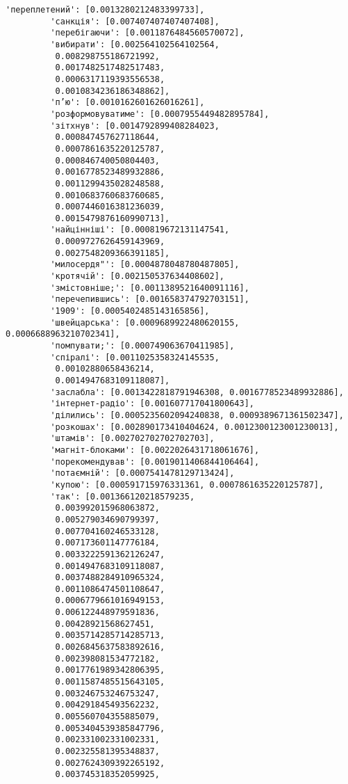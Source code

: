 \documentclass[11pt]{article}
\begin{document}
\begin{Verbatim}[commandchars=\\\{\}]
         'переплетений': [0.0013280212483399733],
         'санкція': [0.007407407407407408],
         'перебігаючи': [0.0011876484560570072],
         'вибирати': [0.002564102564102564,
          0.008298755186721992,
          0.0017482517482517483,
          0.0006317119393556538,
          0.0010834236186348862],
         'п’ю': [0.0010162601626016261],
         'розформовуватиме': [0.0007955449482895784],
         'зітхнув': [0.0014792899408284023,
          0.000847457627118644,
          0.0007861635220125787,
          0.000846740050804403,
          0.0016778523489932886,
          0.0011299435028248588,
          0.0010683760683760685,
          0.0007446016381236039,
          0.0015479876160990713],
         'найцінніші': [0.000819672131147541,
          0.0009727626459143969,
          0.0027548209366391185],
         'милосердя"': [0.0004878048780487805],
         'кротячій': [0.002150537634408602],
         'змістовніше;': [0.0011389521640091116],
         'перечепившись': [0.001658374792703151],
         '1909': [0.0005402485143165856],
         'швейцарська': [0.0009689922480620155, 0.0006688963210702341],
         'помпувати;': [0.000749063670411985],
         'спіралі': [0.0011025358324145535,
          0.00102880658436214,
          0.0014947683109118087],
         'заслабла': [0.0013422818791946308, 0.0016778523489932886],
         'інтернет-радіо': [0.001607717041800643],
         'ділились': [0.0005235602094240838, 0.0009389671361502347],
         'розкошах': [0.002890173410404624, 0.0012300123001230013],
         'штамів': [0.002702702702702703],
         'магніт-блоками': [0.0022026431718061676],
         'порекомендував': [0.0019011406844106464],
         'потаємній': [0.0007541478129713424],
         'купою': [0.000591715976331361, 0.0007861635220125787],
         'так': [0.001366120218579235,
          0.003992015968063872,
          0.005279034690799397,
          0.007704160246533128,
          0.007173601147776184,
          0.0033222591362126247,
          0.0014947683109118087,
          0.0037488284910965324,
          0.0011086474501108647,
          0.0006779661016949153,
          0.006122448979591836,
          0.00428921568627451,
          0.0035714285714285713,
          0.0026845637583892616,
          0.002398081534772182,
          0.0017761989342806395,
          0.0011587485515643105,
          0.003246753246753247,
          0.004291845493562232,
          0.005560704355885079,
          0.0053404539385847796,
          0.002331002331002331,
          0.002325581395348837,
          0.0027624309392265192,
          0.003745318352059925,

\end{Verbatim}
\end{document}
